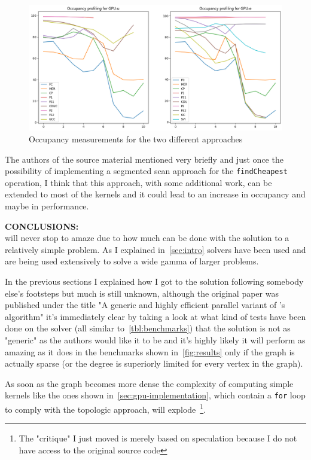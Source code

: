 \documentclass[a4paper,10pt]{article}
\begin{document}
\begin{figure}[!h]
	\centering
	\includegraphics[scale=0.5]{fig/occupancy.png}
	\caption{Occupancy measurements for the two different approaches}
	\label{fig:occupancy}
\end{figure}

The authors of the source material mentioned very briefly and just once the possibility of implementing a segmented scan approach for the \texttt{findCheapest} operation, I think that this approach, with some additional work, can be extended to most of the kernels and it could lead to an increase in occupancy and maybe in performance.

\bigskip
{}
\makeatletter{}\makeatother\label{sec:final-thoughts}
\noindent
\textbf{CONCLUSIONS:}
\\
\mstp will never stop to amaze due to how much can be done with the solution to a relatively simple problem. As I explained in~\ref{sec:intro} \mstp solvers have been used and are being used extensively to solve a wide gamma of larger problems.

In the previous sections I explained how I got to the solution following somebody else's footsteps but much is still unknown, although the original paper was published under the title "A generic and highly efficient parallel variant of \brka's algorithm" it's immediately clear by taking a look at what kind of tests have been done on the solver (all similar to~\ref{tbl:benchmarks}) that the solution is not as "generic" as the authors would like it to be and it's highly likely it will perform as amazing as it does in the benchmarks shown in~\ref{fig:results} only if the graph is actually sparse (or the degree is superiorly limited for every vertex in the graph).

As soon as the graph becomes more dense the complexity of computing simple kernels like the ones shown in~\ref{sec:gpu-implementation}, which contain a \texttt{for} loop to comply with the topologic approach, will explode~\footnote{The "critique" I just moved is merely based on speculation because I do not have access to the original source code}.
\end{document}

